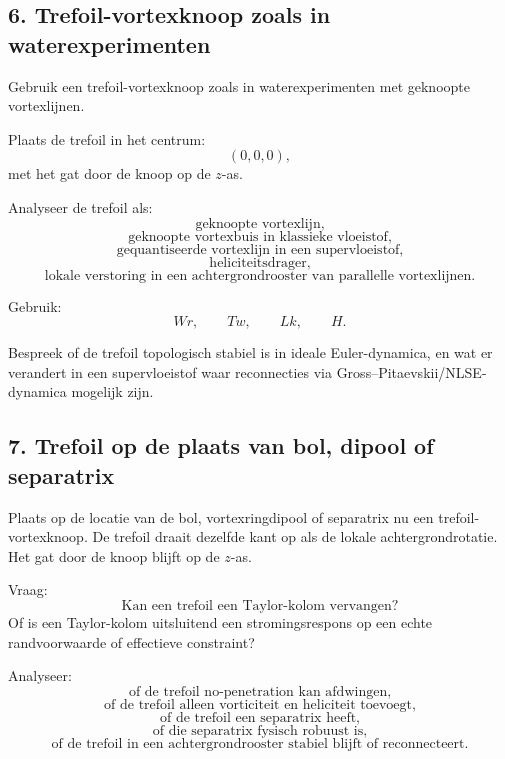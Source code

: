 \documentclass[11pt]{article}
\begin{document}
    \subsection{6. Trefoil-vortexknoop zoals in waterexperimenten}
        
        Gebruik een trefoil-vortexknoop zoals in waterexperimenten met geknoopte vortexlijnen.
        
        Plaats de trefoil in het centrum:
        \[
            (0,0,0),
        \]
        met het gat door de knoop op de \(z\)-as.
        
        Analyseer de trefoil als:
        \[
            \text{geknoopte vortexlijn,}
        \]
        \[
            \text{geknoopte vortexbuis in klassieke vloeistof,}
        \]
        \[
            \text{gequantiseerde vortexlijn in een supervloeistof,}
        \]
        \[
            \text{heliciteitsdrager,}
        \]
        \[
            \text{lokale verstoring in een achtergrondrooster van parallelle vortexlijnen.}
        \]
        
        Gebruik:
        \[
            Wr,
            \qquad
            Tw,
            \qquad
            Lk,
            \qquad
            H.
        \]
        
        Bespreek of de trefoil topologisch stabiel is in ideale Euler-dynamica, en wat er verandert in een supervloeistof waar reconnecties via Gross--Pitaevskii/NLSE-dynamica mogelijk zijn.
    
    \subsection{7. Trefoil op de plaats van bol, dipool of separatrix}
        
        Plaats op de locatie van de bol, vortexringdipool of separatrix nu een trefoil-vortexknoop. De trefoil draait dezelfde kant op als de lokale achtergrondrotatie. Het gat door de knoop blijft op de \(z\)-as.
        
        Vraag:
        \[
            \text{Kan een trefoil een Taylor-kolom vervangen?}
        \]
        Of is een Taylor-kolom uitsluitend een stromingsrespons op een echte randvoorwaarde of effectieve constraint?
        
        Analyseer:
        \[
            \text{of de trefoil no-penetration kan afdwingen,}
        \]
        \[
            \text{of de trefoil alleen vorticiteit en heliciteit toevoegt,}
        \]
        \[
            \text{of de trefoil een separatrix heeft,}
        \]
        \[
            \text{of die separatrix fysisch robuust is,}
        \]
        \[
            \text{of de trefoil in een achtergrondrooster stabiel blijft of reconnecteert.}
        \]
    
\end{document}
